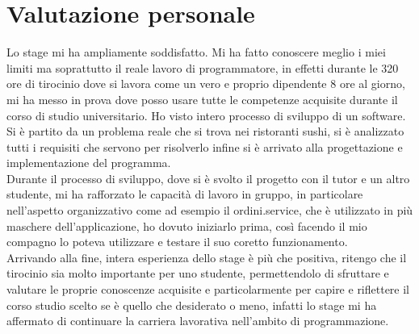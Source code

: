\section{Valutazione personale}
Lo stage mi ha ampliamente soddisfatto. Mi ha fatto conoscere meglio i miei limiti ma soprattutto il reale lavoro di programmatore, in effetti durante le 320 ore di tirocinio dove si lavora come un vero e proprio dipendente 8 ore al giorno, mi ha messo in prova dove posso usare tutte le competenze acquisite durante il corso di studio universitario. Ho visto intero processo di sviluppo di un software. Si è partito da un problema reale che si trova nei ristoranti sushi, si è analizzato tutti i requisiti che servono per risolverlo infine si è arrivato alla progettazione e implementazione del programma.\\
Durante il processo di sviluppo, dove si è svolto il progetto con il tutor e un altro studente, mi ha rafforzato le capacità di lavoro in gruppo, in particolare nell'aspetto organizzativo come ad esempio il ordini.service, che è utilizzato in più maschere dell'applicazione, ho dovuto iniziarlo prima, così facendo il mio compagno lo poteva utilizzare e testare il suo coretto funzionamento.\\
Arrivando alla fine, intera esperienza dello stage è più che positiva, ritengo che il tirocinio sia molto importante per uno studente, permettendolo di sfruttare e valutare le proprie conoscenze acquisite e particolarmente per capire e riflettere il corso studio scelto se è quello che desiderato o meno, infatti lo stage mi ha affermato di continuare la carriera lavorativa nell'ambito di programmazione.